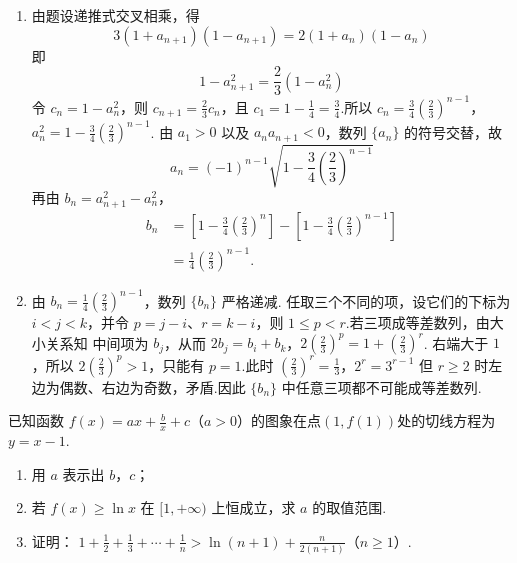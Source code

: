 \begin{solution}
\begin{enumerate}
\item 由题设递推式交叉相乘，得
\[
3(1+a_{n+1})(1-a_{n+1})
=2(1+a_n)(1-a_n)
\]
即
\[
1-a_{n+1}^2=\frac23(1-a_n^2)
\]
令 \(c_n=1-a_n^2\)，则 \(c_{n+1}=\frac23c_n\)，且
\(c_1=1-\frac14=\frac34\).所以
\(c_n=\frac34\left(\frac23\right)^{n-1}\)，\(a_n^2=1-\frac34\left(\frac23\right)^{n-1}\).
由 \(a_1>0\) 以及 \(a_na_{n+1}<0\)，数列 \(\{a_n\}\) 的符号交替，故
\[
a_n=(-1)^{n-1}
\sqrt{1-\frac34\left(\frac23\right)^{n-1}}
\]
再由 \(b_n=a_{n+1}^2-a_n^2\)，
\[
\begin{aligned}
b_n
&=\left[1-\frac34\left(\frac23\right)^n\right]
-\left[1-\frac34\left(\frac23\right)^{n-1}\right]\\
&=\frac14\left(\frac23\right)^{n-1}.
\end{aligned}
\]

\item 由 \(b_n=\frac14\left(\frac23\right)^{n-1}\)，数列 \(\{b_n\}\) 严格递减.
任取三个不同的项，设它们的下标为 \(i<j<k\)，并令
\(p=j-i\)、\(r=k-i\)，则 \(1\leqslant p<r\).若三项成等差数列，由大小关系知
中间项为 \(b_j\)，从而
\(2b_j=b_i+b_k\)，\(2\left(\frac23\right)^p=1+\left(\frac23\right)^r\).
右端大于 \(1\)，所以 \(2(\frac23)^p>1\)，只能有 \(p=1\).此时
\(\left(\frac23\right)^r=\frac13\)，\(2^r=3^{r-1}\)
但 \(r\geqslant2\) 时左边为偶数、右边为奇数，矛盾.因此
\(\{b_n\}\) 中任意三项都不可能成等差数列.
\end{enumerate}
\end{solution}

\begin{problem}
已知函数 \( f(x) = ax + \frac{b}{x} + c \)（\(a > 0\)）的图象在点\((1, f(1))\)处的切线方程为 \( y = x - 1 \).

\begin{enumerate}
\item 用 \(a\) 表示出 \(b\)，\(c\)；
\item 若 \( f(x) \geqslant \ln x \) 在 \([1, +\infty)\) 上恒成立，求 \(a\) 的取值范围.
\item 证明： \(1 + \frac{1}{2} + \frac{1}{3} + \cdots + \frac{1}{n} > \ln (n + 1) + \frac{n}{2(n + 1)}\)（\(n \geqslant 1\)）.
\end{enumerate}
\end{problem}

